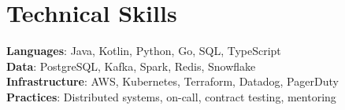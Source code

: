 \documentclass[letterpaper,11pt]{article}
\begin{document}
\section{Technical Skills}
  \begin{itemize}[leftmargin=0.15in, label={}]
    \small{\item{
     \textbf{Languages}{: Java, Kotlin, Python, Go, SQL, TypeScript} \\
     \textbf{Data}{: PostgreSQL, Kafka, Spark, Redis, Snowflake} \\
     \textbf{Infrastructure}{: AWS, Kubernetes, Terraform, Datadog, PagerDuty} \\
     \textbf{Practices}{: Distributed systems, on-call, contract testing, mentoring}
    }}
  \end{itemize}
\end{document}
